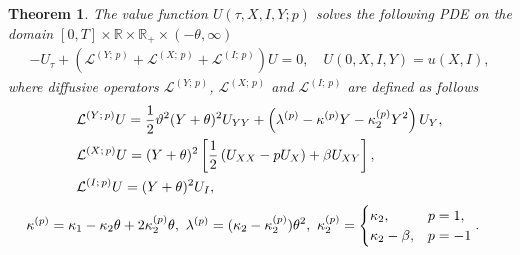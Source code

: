 \documentclass[pdftex,11pt,a4paper] {article}
\newtheorem{theorem}{Theorem}[section]
\begin{document}
\begin{theorem}\label{thm:FeynmannKac}
The value function $U(\tau,X,I,Y; p)$ solves the following PDE on the domain $[0,T]\times\mathbb{R}\times\mathbb{R}_{+}\times(-\theta,\infty)$
\begin{equation}\label{eq:pdeY}
\begin{split}
-U_{\tau} +\left( \mathcal{L}^{(Y;\,p)} + \mathcal{L}^{(X;\,p)} + \mathcal{L}^{(I;\,p)} \right)U =0, \quad U(0,X,I,Y)=u(X,I),
\end{split}
\end{equation}
where diffusive operators $\mathcal{L}^{(Y;\,p)}$, $\mathcal{L}^{(X;\,p)}$ and $\mathcal{L}^{(I;\,p)}$ are defined as follows
\begin{equation} \label{eq:pdeLY1}
\begin{split}
&\mathcal{L}^{(Y;\,p)}U= \frac{1}{2} \vartheta^{2} (Y+\theta)^{2} U_{YY}+\left(\lambda^{(p)} - \kappa^{(p)} Y   - \kappa_{2}^{(p)}Y^{2}\right)U_{Y},\\
&\mathcal{L}^{(X;\,p)}U= (Y+\theta)^{2} \left[ \frac{1}{2}\left( U_{XX} -p U_{X} \right)+\beta U_{XY}\right],\\
&\mathcal{L}^{(I;\,p)}U= (Y+\theta)^{2}U_{I},\vspace*{-1\baselineskip}
\end{split}
\end{equation}\vspace*{-1.0\baselineskip}
\begin{equation*}\vspace*{-1.0\baselineskip}
\begin{split}
& \kappa^{(p)}=\kappa_1-\kappa_2\theta+2\kappa_2^{(p)} \theta, \ \lambda^{(p)}=(\kappa_2-\kappa_2^{(p)})\theta^2, \ \kappa_2^{(p)}=
\begin{cases}
\kappa_2,& p=1,\\
\kappa_2-\beta,& p=-1\\
\end{cases}.
\end{split}
\end{equation*}
\end{theorem}
\end{document}

